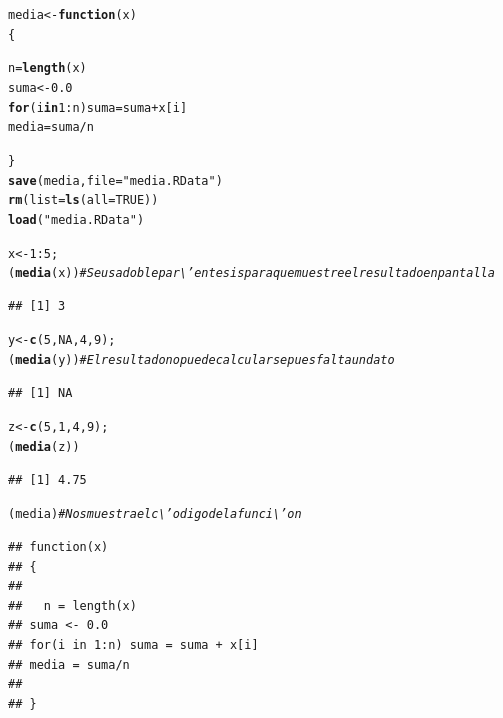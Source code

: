 \documentclass[12pt,letterpaper]{article}\usepackage[]{graphicx}\usepackage[]{color}
\makeatletter
\newcommand{\hlnum}[1]{\textcolor[rgb]{0.686,0.059,0.569}{#1}}%
\newcommand{\hlstr}[1]{\textcolor[rgb]{0.192,0.494,0.8}{#1}}%
\newcommand{\hlcom}[1]{\textcolor[rgb]{0.678,0.584,0.686}{\textit{#1}}}%
\newcommand{\hlopt}[1]{\textcolor[rgb]{0,0,0}{#1}}%
\newcommand{\hlstd}[1]{\textcolor[rgb]{0.345,0.345,0.345}{#1}}%
\newcommand{\hlkwa}[1]{\textcolor[rgb]{0.161,0.373,0.58}{\textbf{#1}}}%
\newcommand{\hlkwb}[1]{\textcolor[rgb]{0.69,0.353,0.396}{#1}}%
\newcommand{\hlkwc}[1]{\textcolor[rgb]{0.333,0.667,0.333}{#1}}%
\newcommand{\hlkwd}[1]{\textcolor[rgb]{0.737,0.353,0.396}{\textbf{#1}}}%
\newenvironment{kframe}{%
 \def\at@end@of@kframe{}%
 \ifinner\ifhmode%
  \def\at@end@of@kframe{\end{minipage}}%
  \begin{minipage}{\columnwidth}%
 \fi\fi%
 \def\FrameCommand##1{\hskip\@totalleftmargin \hskip-\fboxsep
 \colorbox{shadecolor}{##1}\hskip-\fboxsep
     \hskip-\linewidth \hskip-\@totalleftmargin \hskip\columnwidth}%
 \MakeFramed {\advance\hsize-\width
   \@totalleftmargin\z@ \linewidth\hsize
   \@setminipage}}%
 {\par\unskip\endMakeFramed%
 \at@end@of@kframe}
\newenvironment{knitrout}{}{} %
\makeatother
\begin{document}
\begin{knitrout}
\color{fgcolor}\begin{kframe}
\begin{alltt}
\hlstd{media} \hlkwb{<-} \hlkwa{function}\hlstd{(}\hlkwc{x}\hlstd{)}
\hlstd{\{}

  \hlstd{n} \hlkwb{=} \hlkwd{length}\hlstd{(x)}
\hlstd{suma} \hlkwb{<-} \hlnum{0.0}
\hlkwa{for}\hlstd{(i} \hlkwa{in} \hlnum{1}\hlopt{:}\hlstd{n) suma} \hlkwb{=} \hlstd{suma} \hlopt{+} \hlstd{x[i]}
\hlstd{media} \hlkwb{=} \hlstd{suma}\hlopt{/}\hlstd{n}

\hlstd{\}}
\hlkwd{save}\hlstd{(media,} \hlkwc{file}\hlstd{=} \hlstr{"media.RData"}\hlstd{)}
\hlkwd{rm}\hlstd{(}\hlkwc{list}\hlstd{=}\hlkwd{ls}\hlstd{(}\hlkwc{all}\hlstd{=}\hlnum{TRUE}\hlstd{))}
\hlkwd{load}\hlstd{(}\hlstr{"media.RData"}\hlstd{)}

\hlstd{x} \hlkwb{<-} \hlnum{1}\hlopt{:}\hlnum{5}\hlstd{;}
\hlstd{(}\hlkwd{media}\hlstd{(x))} \hlcom{# Se usa doble par\textbackslash{}'entesis para que muestre el resultado en pantalla}
\end{alltt}
\begin{verbatim}
## [1] 3
\end{verbatim}
\begin{alltt}
\hlstd{y} \hlkwb{<-} \hlkwd{c}\hlstd{(}\hlnum{5}\hlstd{,} \hlnum{NA} \hlstd{,} \hlnum{4}\hlstd{,} \hlnum{9}\hlstd{);}
\hlstd{(}\hlkwd{media}\hlstd{(y))} \hlcom{# El resultado no puede calcularse pues falta un dato}
\end{alltt}
\begin{verbatim}
## [1] NA
\end{verbatim}
\begin{alltt}
\hlstd{z} \hlkwb{<-} \hlkwd{c}\hlstd{(}\hlnum{5}\hlstd{,} \hlnum{1} \hlstd{,} \hlnum{4}\hlstd{,} \hlnum{9}\hlstd{);}
\hlstd{(}\hlkwd{media}\hlstd{(z))}
\end{alltt}
\begin{verbatim}
## [1] 4.75
\end{verbatim}
\begin{alltt}
\hlstd{(media)} \hlcom{# Nos muestra el c\textbackslash{}'odigo de la funci\textbackslash{}'on}
\end{alltt}
\begin{verbatim}
## function(x)
## {
## 
##   n = length(x)
## suma <- 0.0
## for(i in 1:n) suma = suma + x[i]
## media = suma/n
## 
## }
\end{verbatim}
\end{kframe}
\end{knitrout}
\end{document}
